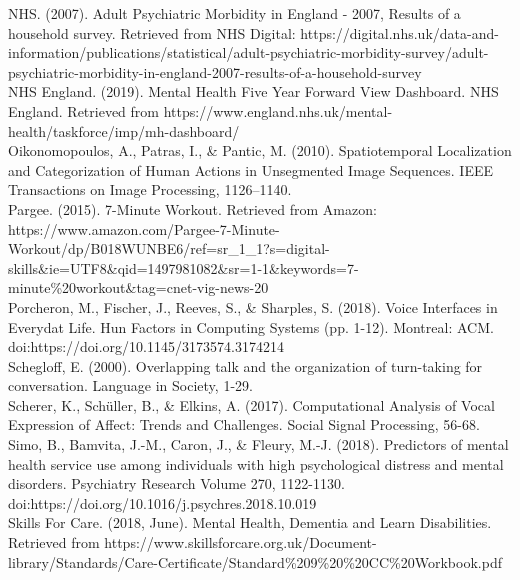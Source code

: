 \documentclass[a4paper,11pt]{report}
\begin{document}
NHS. (2007). Adult Psychiatric Morbidity in England - 2007, Results of a household survey. Retrieved from NHS Digital: https://digital.nhs.uk/data-and-information/publications/statistical/adult-psychiatric-morbidity-survey/adult-psychiatric-morbidity-in-england-2007-results-of-a-household-survey\\

NHS England. (2019). Mental Health Five Year Forward View Dashboard. NHS England. Retrieved from https://www.england.nhs.uk/mental-health/taskforce/imp/mh-dashboard/\\

Oikonomopoulos, A., Patras, I., \& Pantic, M. (2010). Spatiotemporal Localization and Categorization of Human Actions in Unsegmented Image Sequences. IEEE Transactions on Image Processing, 1126–1140.\\

Pargee. (2015). 7-Minute Workout. Retrieved from Amazon: https://www.amazon.com/Pargee-7-Minute-Workout/dp/B018WUNBE6/ref=sr\_1\_1?s=digital-skills\&ie=UTF8\&qid=1497981082\&sr=1-1\&keywords=7-minute\%20workout\&tag=cnet-vig-news-20\\

Porcheron, M., Fischer, J., Reeves, S., \& Sharples, S. (2018). Voice Interfaces in Everydat Life. Hun Factors in Computing Systems (pp. 1-12). Montreal: ACM. doi:https://doi.org/10.1145/3173574.3174214\\

Schegloff, E. (2000). Overlapping talk and the organization of turn-taking for conversation. Language in Society, 1-29.\\

Scherer, K., Schüller, B., \& Elkins, A. (2017). Computational Analysis of Vocal Expression of Affect: Trends and Challenges. Social Signal Processing, 56-68.\\

Simo, B., Bamvita, J.-M., Caron, J., \& Fleury, M.-J. (2018). Predictors of mental health service use among individuals with high psychological distress and mental disorders. Psychiatry Research Volume 270, 1122-1130. doi:https://doi.org/10.1016/j.psychres.2018.10.019\\

Skills For Care. (2018, June). Mental Health, Dementia and Learn Disabilities. Retrieved from https://www.skillsforcare.org.uk/Document-library/Standards/Care-Certificate/Standard\%209\%20\%20CC\%20Workbook.pdf\\
\end{document}
